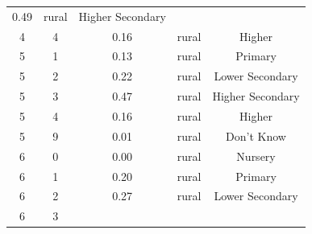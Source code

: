 \documentclass[stu, 12pt, floatsintext,longtable]{apa7}
\begin{document}
\begin{longtable}{ccccc}
    0.49
                                                       &
    rural                                              & Higher Secondary
    \\
    4                                                  & 4                    &
    0.16
                                                       &
    rural                                              & Higher
    \\
    5                                                  & 1                    &
    0.13
                                                       &
    rural                                              & Primary
    \\
    5                                                  & 2                    &
    0.22
                                                       &
    rural                                              & Lower Secondary
    \\
    5                                                  & 3                    &
    0.47
                                                       &
    rural                                              & Higher Secondary
    \\
    5                                                  & 4                    &
    0.16
                                                       &
    rural                                              & Higher
    \\
    5                                                  & 9                    &
    0.01
                                                       &
    rural                                              & Don't Know
    \\
    6                                                  & 0                    &
    0.00
                                                       &
    rural                                              & Nursery
    \\
    6                                                  & 1                    &
    0.20
                                                       &
    rural                                              & Primary
    \\
    6                                                  & 2                    &
    0.27
                                                       &
    rural                                              & Lower Secondary
    \\
    6                                                  & 3                    &

\end{longtable}
\end{document}

